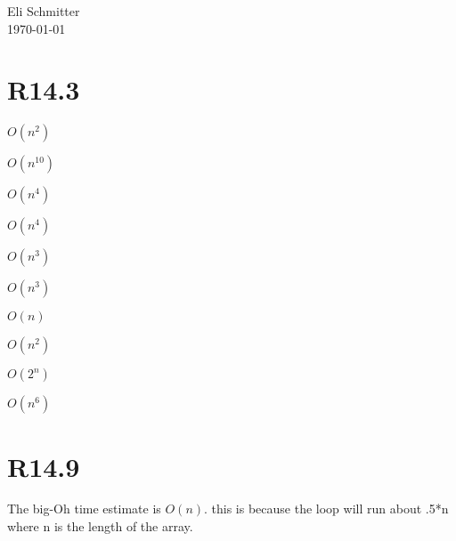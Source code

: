 \documentclass{article}
\begin{document}
\begin{flushleft}
 Eli Schmitter\\
 \today
\end{flushleft}
\section{R14.3}
\begin{alphalist}
 \item $O(n^2)$
 \item $O(n^{10})$
 \item $O(n^4)$
 \item $O(n^4)$
 \item $O(n^3)$
 \item $O(n^3)$
 \item $O(n)$
 \item $O(n^2)$
 \item $O(2^n)$
 \item $O(n^6)$
\end{alphalist}
\section{R14.9}
The big-Oh time estimate is $O(n)$. this is because the loop will run about .5*n where n is the length of the array.
\end{document}
